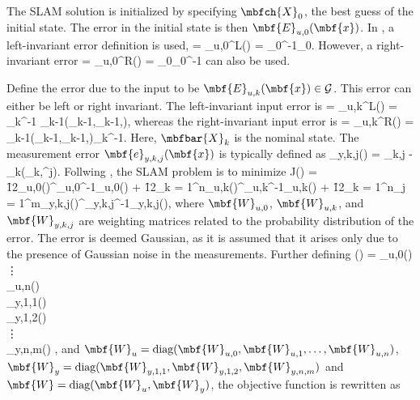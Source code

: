 The SLAM solution is initialized by specifying $\mbfch{X}_0$, the best guess of the initial state. The error in the initial state is then $\mbf{E}_{u,0}(\mbf{x})$. In \cite{Barfoot2017}, a left-invariant error definition is used,
\bdis	
	 =  _{u,0}^\textrm{L}() = _0^{-1}_0.
\edis
However, a right-invariant error
\bdis	
	 =  _{u,0}^\textrm{R}() = _0_0^{-1}
\edis
can also be used. 

Define the error due to the input to be $\mbf{E}_{u,k}(\mbf{x}) \in \mathcal{G}$. This error can either be left or right invariant. The left-invariant input error is
\beq
	 = _{u,k}^\textrm{L}() = _k^{-1} _{k-1}\left(_{k-1},_{k-1},\right), \label{eq:batch_left_input_err}
\eeq
whereas the right-invariant input error is
\beq
	 = _{u,k}^\textrm{R}() = _{k-1}\left(_{k-1},_{k-1},\right)_k^{-1}. \label{eq:batch_right_input_err}
\eeq
Here, $\mbfbar{X}_k$ is the nominal state. The measurement error $\mbf{e}_{y,k,j}(\mbf{x})$ is typically defined as
\beq
	_{y,k,j}() = _{k,j} - _k\left(_k,^j\right). \label{eq:meas_err}
\eeq
Follwing \cite[pp. 127-143]{Barfoot2017}, the SLAM problem is to minimize 
\bdis
	J() = \f{1}{2}_{u,0}()^\trans{}_{u,0}^{-1}_{u,0}() + \f{1}{2}\sum_{k = 1}^n_{u,k}()^\trans{}_{u,k}^{-1}_{u,k}() + \f{1}{2}\sum_{k = 1}^n\sum_{j = 1}^m_{y,k,j}()^\trans{}_{y,k,j}^{-1}_{y,k,j}(),
\edis
where $\mbf{W}_{u,0}$, $\mbf{W}_{u,k}$, and $\mbf{W}_{y,k,j}$ are weighting matrices related to the probability distribution of the error. The error is deemed Gaussian, as it is assumed that it arises only due to the presence of Gaussian noise in the measurements.  Further defining
\bdis
	() =
		_{u,0}() \\
		\vdots \\
		_{u,n}()\\
		\hline
		_{y,1,1}() \\
		_{y,1,2}() \\
		\vdots \\
		_{y,n,m}()
	\ema,
\edis
and $\mbf{W}_{u} = \textrm{diag}(\mbf{W}_{u,0},\mbf{W}_{u,1},\ldots,\mbf{W}_{u,n})$, $\mbf{W}_y = \textrm{diag}(\mbf{W}_{y,1,1},\mbf{W}_{y,1,2},\mbf{W}_{y,n,m})$ and $\mbf{W} = \textrm{diag}(\mbf{W}_u,\mbf{W}_y)$, the objective function is rewritten as
